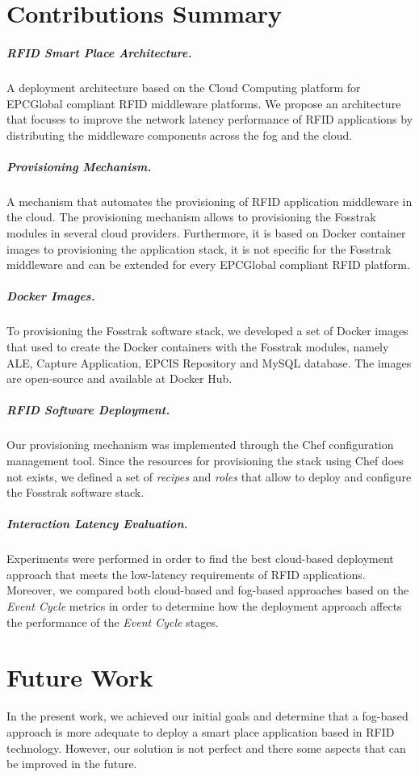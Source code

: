 \section{Contributions Summary}
\label{sec:contributions}

\subparagraph{RFID Smart Place Architecture.}
\label{subp:rfid_smart_place_architecture}
A deployment architecture based on the Cloud Computing platform for EPCGlobal compliant \gls{RFID}
middleware platforms. We propose an architecture that focuses to improve the network latency
performance of \gls{RFID} applications by distributing the middleware components across the fog and
the cloud.

\subparagraph{Provisioning Mechanism.}
\label{subp:provisioning_mechanism}
A mechanism that automates the provisioning of \gls{RFID} application middleware in the cloud.
The provisioning mechanism allows to provisioning the Fosstrak modules in several cloud
providers. Furthermore, it is based on Docker container images to provisioning the application
stack, it is not specific for the Fosstrak middleware and can be extended for every EPCGlobal
compliant \gls{RFID} platform.

\subparagraph{Docker Images.}
\label{subp:docker_images}
To provisioning the Fosstrak software stack, we developed a set of Docker images that used to
create the Docker containers with the Fosstrak modules, namely \gls{ALE}, Capture Application,
\gls{EPCIS} Repository and MySQL database. The images are open-source and available at
Docker Hub.

\subparagraph{RFID Software Deployment.}
\label{subp:RFID Software Deployment}
Our provisioning mechanism was implemented through the Chef configuration management tool. Since the
resources for provisioning the stack using Chef does not exists, we defined a set of \textit{recipes}
and \textit{roles} that allow to deploy and configure the Fosstrak software stack.

\subparagraph{Interaction Latency Evaluation.}
\label{subp:event_latency_performance_eval}
Experiments were performed in order to find the best cloud-based deployment approach that meets the
low-latency requirements of \gls{RFID} applications. Moreover, we compared both cloud-based and fog-based
approaches based on the \textit{Event Cycle} metrics in order to determine how the deployment
approach affects the performance of the \textit{Event Cycle} stages.

\section{Future Work}
\label{sec:future_work}
In the present work, we achieved our initial goals and determine that a fog-based approach is more
adequate to deploy a smart place application based in \gls{RFID} technology. However, our solution
is not perfect and there some aspects that can be improved in the future.

